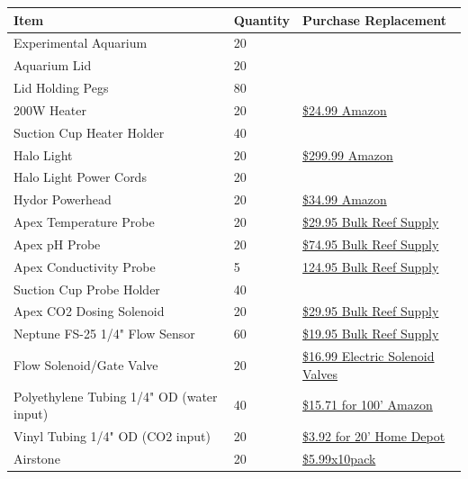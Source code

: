 \documentclass[]{book}
\begin{document}
\begin{longtable}[]{@{}lll@{}}
\toprule
Item & Quantity & Purchase Replacement\tabularnewline
\midrule
\endhead
Experimental Aquarium & 20 &\tabularnewline
Aquarium Lid & 20 &\tabularnewline
Lid Holding Pegs & 80 &\tabularnewline
200W Heater & 20 &
\href{https://www.amazon.com/Hydor-Submersible-Glass-Aquarium-Heater/dp/B00061UQ7K}{\$24.99
Amazon}\tabularnewline
Suction Cup Heater Holder & 40 &\tabularnewline
Halo Light & 20 &
\href{https://www.amazon.com/Aquatic-Life-Halo-Basic-Fixture/dp/B00T6FGDJW}{\$299.99
Amazon}\tabularnewline
Halo Light Power Cords & 20 &\tabularnewline
Hydor Powerhead & 20 &
\href{https://www.amazon.com/Hydor-Koralia-Nano-Aquarium-Circulation/dp/B0036S70ZG/ref=sr_1_2?keywords=hydor+powerhead\&qid=1572981966\&s=pet-supplies\&sr=1-2}{\$34.99
Amazon}\tabularnewline
Apex Temperature Probe & 20 &
\href{https://www.bulkreefsupply.com/temperature-probe-neptune-systems.html}{\$29.95
Bulk Reef Supply}\tabularnewline
Apex pH Probe & 20 &
\href{https://www.bulkreefsupply.com/lab-grade-double-junction-ph-probe-neptune-systems.html}{\$74.95
Bulk Reef Supply}\tabularnewline
Apex Conductivity Probe & 5 &
\href{https://www.bulkreefsupply.com/neptune-systems-lab-grade-conductivity-probe.html}{124.95
Bulk Reef Supply}\tabularnewline
Suction Cup Probe Holder & 40 &\tabularnewline
Apex CO2 Dosing Solenoid & 20 &
\href{https://www.bulkreefsupply.com/sv-1-solenoid-valve-neptune-systems.html}{\$29.95
Bulk Reef Supply}\tabularnewline
Neptune FS-25 1/4" Flow Sensor & 60 &
\href{https://www.bulkreefsupply.com/1-4-flow-sensor-fs25-neptune-systems.html}{\$19.95
Bulk Reef Supply}\tabularnewline
Flow Solenoid/Gate Valve & 20 &
\href{https://www.electricsolenoidvalves.com/1-4-120v-ac-electric-plastic-solenoid-valve/}{\$16.99
Electric Solenoid Valves}\tabularnewline
Polyethylene Tubing 1/4" OD (water input) & 40 &
\href{https://www.amazon.com/Dixon-0817-Polyethylene-DI087002-Natural/dp/B00LT0T3MG/ref=sr_1_4?crid=ETZJL4UXADQY\&dchild=1\&keywords=polyethylene+tubing+1\%2F4+od\&qid=1590806141\&sprefix=polyethylene+tubing\%2Caps\%2C211\&sr=8-4\#feature-bullets-btf}{\$15.71
for 100' Amazon}\tabularnewline
Vinyl Tubing 1/4" OD (CO2 input) & 20 &
\href{https://www.homedepot.com/p/Everbilt-1-4-in-O-D-x-1-6-in-I-D-x-20-ft-Clear-PVC-Vinyl-Tubing-701968/207144351}{\$3.92
for 20' Home Depot}\tabularnewline
Airstone & 20 &
\href{https://www.amazon.com/Pawfly-Cylinder-Diffuser-Airstones-Hydroponics/dp/B075QCWGZQ/ref=sr_1_5?crid=3EXLLKKDA2NYZ\&keywords=airstones+for+aquariums\&qid=1572983301\&sprefix=airstone\%2Caps\%2C197\&sr=8-5}{\$5.99x10pack
}
\end{longtable}
\end{document}
